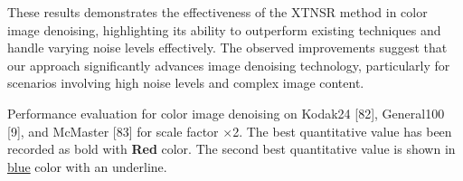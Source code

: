\documentclass[twocolumn]{svjour3}          %
\begin{document}
These results demonstrates the effectiveness of the XTNSR method in color image denoising, highlighting its ability to outperform existing techniques and handle varying noise levels effectively. The observed improvements suggest that our approach significantly advances image denoising technology, particularly for scenarios involving high noise levels and complex image content.


\begin{table}
\centering
\caption{Performance evaluation for color image denoising on Kodak24 [82], General100 [9], and McMaster [83] for scale factor $\times$2. The best quantitative value has been recorded as bold with {\color{red}\textbf{Red }} color. The second best quantitative value is shown in {\color{blue}\underline{blue}} color with an underline.}
\label{tab:comparison}


\end{table}
\end{document}

